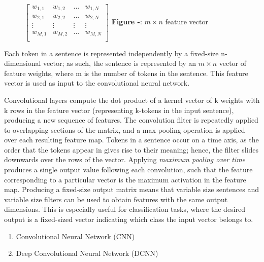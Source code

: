 \documentclass[12pt,a4paper]{article}
\begin{document}
\begin{minipage}{0.35\textwidth}
	\begin{figure}[H]
		\begin{center}
		$
		\begin{bmatrix}
		w_{1,1} & w_{1,2} & ... & w_{1,N}\\
		w_{2, 1} & w_{2, 2} & ... & w_{2, N} \\
		\vdots & \vdots & \vdots & \vdots \\
		w_{M, 1} & w_{M, 2} & ... & w_{M, N} \\
		\end{bmatrix}
		$
		\textbf{Figure -}: $m \times n$ feature vector\\
	\end{center}
	\end{figure}
\end{minipage} \hfill
\begin{minipage}{0.6\textwidth}
	Each token in a sentence is represented independently by a fixed-size n-dimensional vector; as such, the sentence is represented by an $m \times n$ vector of feature weights, where m is the number of tokens in the sentence. This feature vector is used as input to the convolutional neural network. 
\end{minipage}

\noindent Convolutional layers compute the dot product of a kernel vector of k weights with k rows in the feature vector (representing k-tokens in the input sentence), producing a new sequence of features. The convolution filter is repeatedly applied to overlapping sections of the matrix, and a max pooling operation is applied over each resulting feature map. Tokens in a sentence occur on a time axis, as the order that the tokens appear in gives rise to their meaning; hence, the filter slides downwards over the rows of the vector. Applying \textit{maximum pooling over time} produces a single output value following each convolution, such that the feature corresponding to a particular vector is the maximum activation in the feature map. Producing a fixed-size output matrix means that variable size sentences and variable size filters can be used to obtain features with the same output dimensions. This is especially useful for classification tasks, where the desired output is a fixed-sized vector indicating which class the input vector belongs to.

\begin{enumerate}
	\item Convolutional Neural Network (CNN)
	\item Deep Convolutional Neural Network (DCNN)
\end{enumerate}
\end{document}
